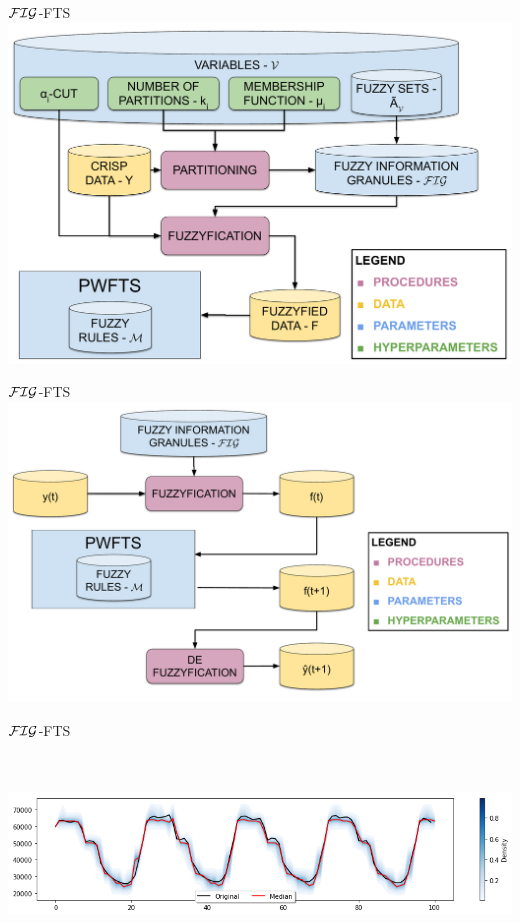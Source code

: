 \documentclass{beamer}
\begin{document}
\begin{frame}{$\mathcal{FIG}$-FTS}
\includegraphics[width=\textwidth]{figures/figfts_training_procedure.pdf}
\end{frame}

\begin{frame}{$\mathcal{FIG}$-FTS}
\includegraphics[width=\textwidth]{figures/figfts_forecasting_procedure.pdf}
\end{frame}

\begin{frame}{$\mathcal{FIG}$-FTS}
\includegraphics[width=\textwidth,height=6cm]{figures/figfts_probabilistic_onestep.png}
\end{frame}
\end{document}
